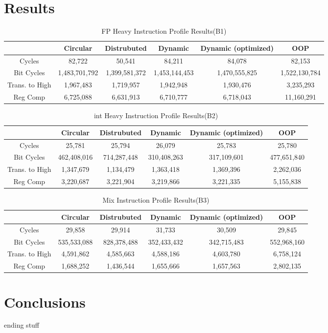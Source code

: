 \section{Results}

\begin{table*}
\centering
\caption{FP Heavy Instruction Profile Results(B1)}
\begin{tabular}{|c|c|c|c|c|c|} \hline
    & Circular  & Distrubuted & Dynamic & Dynamic (optimized) & OOP\\ \hline
Cycles&82,722	&50,541&    	84,211	&84,078&        	82,153\\ \hline
Bit Cycles&1,483,701,792&	1,399,581,372&	1,453,144,453	&1,470,555,825	&1,522,130,784\\ \hline
Trans. to High&1,967,483&	1,719,957	&1,942,948	&1,930,476	&3,235,293\\ \hline
Reg Comp&6,725,088&	6,631,913&	6,710,777&	6,718,043	&11,160,291\\ \hline
\end{tabular}
\end{table*}

\begin{table*}
\centering
\caption{int Heavy Instruction Profile Results(B2)}
\begin{tabular}{|c|c|c|c|c|c|} \hline
    & Circular  & Distrubuted & Dynamic & Dynamic (optimized) & OOP\\ \hline
Cycles&25,781&	25,794&	26,079	&25,783	&25,780\\ \hline
Bit Cycles&462,408,016	&714,287,448	&310,408,263	&317,109,601	&477,651,840\\ \hline
Trans. to High&1,347,679&	1,134,479	&1,363,418&	1,369,396	&2,262,036\\ \hline
Reg Comp&3,220,687	&3,221,904	&3,219,866	&3,221,335&	5,155,838\\ \hline
\end{tabular}
\end{table*}


\begin{table*}
\centering
\caption{Mix Instruction Profile Results(B3)}
\begin{tabular}{|c|c|c|c|c|c|} \hline
    & Circular  & Distrubuted & Dynamic & Dynamic (optimized) & OOP\\ \hline
Cycles&29,858	&29,914	&31,733	&30,509	&29,845\\ \hline

Bit Cycles&535,533,088&	828,378,488&	352,433,432	&342,715,483	&552,968,160\\ \hline

Trans. to High&4,591,862	&4,585,663	&4,588,186&	4,603,780&	6,758,124\\ \hline

Reg Comp&1,688,252&	1,436,544	&1,655,666	&1,657,563	&2,802,135\\ \hline
\end{tabular}
\end{table*}



\section{Conclusions}
ending stuff
